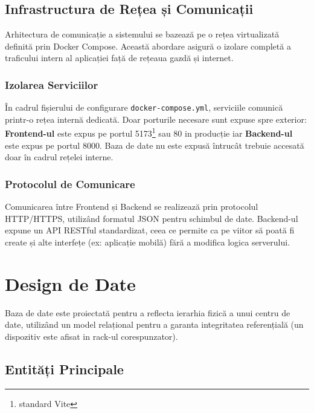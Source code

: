 \documentclass[12pt,a4paper]{article}
\begin{document}
\subsection{Infrastructura de Rețea și Comunicații}
\label{subsec:retea}

\hspace{1em} Arhitectura de comunicație a sistemului se bazează pe o rețea virtualizată definită prin Docker Compose. Această abordare asigură o izolare completă a traficului intern al aplicației față de rețeaua gazdă și internet.

\subsubsection{Izolarea Serviciilor}
În cadrul fișierului de configurare \texttt{docker-compose.yml}, serviciile comunică printr-o rețea internă dedicată. Doar porturile necesare sunt expuse spre exterior: \textbf{Frontend-ul} este expus pe portul 5173\footnote{standard Vite} sau 80 in producție iar \textbf{Backend-ul} este expus pe portul 8000. Baza de date nu este expusă întrucât trebuie accesată doar în cadrul rețelei interne.

\subsubsection{Protocolul de Comunicare}
Comunicarea între Frontend și Backend se realizează prin protocolul HTTP/HTTPS, utilizând formatul JSON pentru schimbul de date. Backend-ul expune un API RESTful standardizat, ceea ce permite ca pe viitor să poată fi create și alte interfețe (ex: aplicație mobilă) fără a modifica logica serverului.

\section{Design de Date}
\label{sec:datadesign}

Baza de date este proiectată pentru a reflecta ierarhia fizică a unui centru de date, utilizând un model relațional pentru a garanta integritatea referențială (un dispozitiv este afisat in rack-ul corespunzator).

\subsection{Entități Principale}
\end{document}
